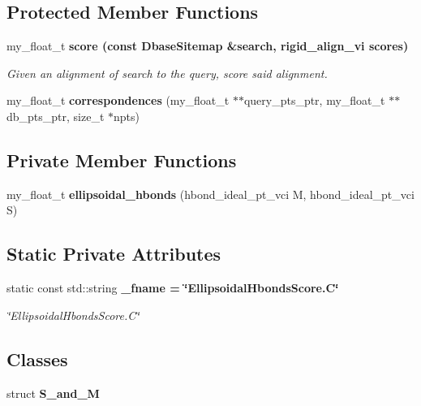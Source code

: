 \subsection*{Protected Member Functions}
\begin{CompactItemize}
\item 
my\_\-float\_\-t \bf{score} (const \bf{Dbase\-Sitemap} \&search, rigid\_\-align\_\-vi scores)
\begin{CompactList}\small\item\em Given an alignment of search to the query, score said alignment. \item\end{CompactList}\item 
my\_\-float\_\-t \textbf{correspondences} (my\_\-float\_\-t $\ast$$\ast$query\_\-pts\_\-ptr, my\_\-float\_\-t $\ast$$\ast$db\_\-pts\_\-ptr, size\_\-t $\ast$npts)\label{classSimSite3D_1_1EllipsoidalHbondsScore_0a9f3e22c78ef2bcca8664f02a7872f2}

\end{CompactItemize}
\subsection*{Private Member Functions}
\begin{CompactItemize}
\item 
my\_\-float\_\-t \textbf{ellipsoidal\_\-hbonds} (hbond\_\-ideal\_\-pt\_\-vci M, hbond\_\-ideal\_\-pt\_\-vci S)\label{classSimSite3D_1_1EllipsoidalHbondsScore_861b13badedb987217cec9af4e1195bd}

\end{CompactItemize}
\subsection*{Static Private Attributes}
\begin{CompactItemize}
\item 
static const std::string \bf{\_\-fname} = \char`\"{}Ellipsoidal\-Hbonds\-Score.C\char`\"{}\label{classSimSite3D_1_1EllipsoidalHbondsScore_5cdf6a4baeab56e974e38792877003f0}

\begin{CompactList}\small\item\em \char`\"{}Ellipsoidal\-Hbonds\-Score.C\char`\"{} \item\end{CompactList}\end{CompactItemize}
\subsection*{Classes}
\begin{CompactItemize}
\item 
struct \textbf{S\_\-and\_\-M}
\end{CompactItemize}


